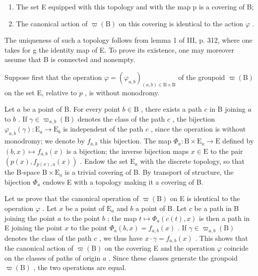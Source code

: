 \begin{enumerate}
\def\labelenumi{(\roman{enumi})}
\item
  The set E equipped with this topology and with the map p is a covering of B;
\item
  The canonical action of \(\varpi(\mathrm{B})\) on this covering is identical to the action \(\varphi\) .
\end{enumerate}

The uniqueness of such a topology follows from lemma 1 of III, p. 312, where one takes for g the identity map of E. To prove its existence, one may moreover assume that B is connected and nonempty.

Suppose first that the operation \(\varphi = (\varphi_{a,b})_{(a,b)\in \mathrm{B}\times \mathrm{B}}\) of the groupoid \(\varpi (\mathrm{B})\) on the set E, relative to \(p\) , is without monodromy.

Let \(a\) be a point of B. For every point \(b \in \mathrm{B}\) , there exists a path \(c\) in B joining \(a\) to \(b\) . If \(\gamma \in \varpi_{a,b}(\mathrm{B})\) denotes the class of the path \(c\) , the bijection \(\varphi_{a,b}(\gamma) \colon \mathrm{E}_a \to \mathrm{E}_b\) is independent of the path \(c\) , since the operation is without monodromy; we denote by \(f_{a,b}\) this bijection. The map \(\Phi_a \colon \mathrm{B} \times \mathrm{E}_a \to \mathrm{E}\) defined by \((b,x) \mapsto f_{a,b}(x)\) is a bijection; the inverse bijection maps \(x \in \mathrm{E}\) to the pair \((p(x), f_{p(x),a}(x))\) . Endow the set \(\mathrm{E}_a\) with the discrete topology, so that the B-space \(\mathrm{B} \times \mathrm{E}_a\) is a trivial covering of B. By transport of structure, the bijection \(\Phi_a\) endows E with a topology making it a covering of B.

Let us prove that the canonical operation of \(\varpi(\mathrm{B})\) on E is identical to the operation \(\varphi\) . Let \(x\) be a point of \(\mathrm{E}_a\) and \(b\) a point of B. Let \(c\) be a path in B joining the point \(a\) to the point \(b\) ; the map \(t \mapsto \Phi_a(c(t), x)\) is then a path in E joining the point \(x\) to the point \(\Phi_a(b, x) = f_{a,b}(x)\) . If \(\gamma \in \varpi_{a,b}(\mathrm{B})\) denotes the class of the path \(c\) , we thus have \(x \cdot \gamma = f_{a,b}(x)\) . This shows that the canonical action of \(\varpi(\mathrm{B})\) on the covering E and the operation \(\varphi\) coincide on the classes of paths of origin \(a\) . Since these classes generate the groupoid \(\varpi(\mathrm{B})\) , the two operations are equal.

